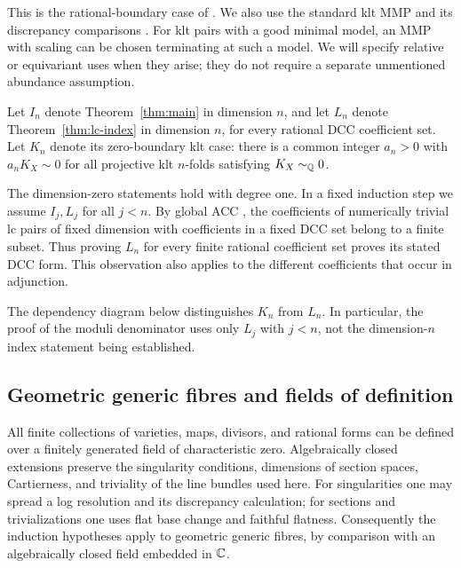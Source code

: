 This is the rational-boundary case of \cite[Theorem~11.1]{LA}.
We also use the standard klt MMP and its discrepancy comparisons
\cite{BCHM2010}. For klt pairs with a good minimal model, an MMP with
scaling can be chosen terminating at such a model. We will specify
relative or equivariant uses when they arise; they do not require a
separate unmentioned abundance assumption.

\begin{notation}\label{not:induction}
Let $I_n$ denote Theorem~\ref{thm:main} in dimension $n$, and let $L_n$
denote Theorem~\ref{thm:lc-index} in dimension $n$, for every rational
DCC coefficient set. Let $K_n$ denote its zero-boundary klt case:
there is a common integer $a_n>0$ with $a_nK_X\sim0$ for all projective
klt $n$-folds satisfying $K_X\sim_\mathbb Q0$.
\end{notation}

The dimension-zero statements hold with degree one. In a fixed
induction step we assume $I_j,L_j$ for all $j<n$. By global ACC
\cite[Theorem~1.5]{HMX2014}, the coefficients of numerically trivial
lc pairs of fixed dimension with coefficients in a fixed DCC set
belong to a finite subset. Thus proving $L_n$ for every finite
rational coefficient set proves its stated DCC form. This observation
also applies to the different coefficients that occur in adjunction.

The dependency diagram below distinguishes $K_n$ from $L_n$. In
particular, the proof of the moduli denominator uses only $L_j$ with
$j<n$, not the dimension-$n$ index statement being established.


\subsection{Geometric generic fibres and fields of definition}

All finite collections of varieties, maps, divisors, and rational
forms can be defined over a finitely generated field of characteristic
zero. Algebraically closed extensions preserve the singularity
conditions, dimensions of section spaces, Cartierness, and triviality
of the line bundles used here. For singularities one may spread a log
resolution and its discrepancy calculation; for sections and
trivializations one uses flat base change and faithful flatness.
Consequently the induction hypotheses apply to geometric generic
fibres, by comparison with an algebraically closed field embedded in
$\mathbb C$.

